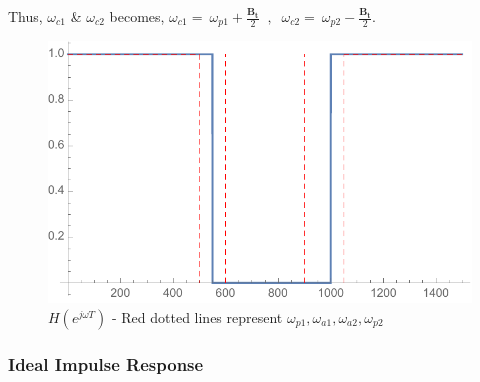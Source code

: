 \documentclass[11pt]{article}
\begin{document}
Thus, $\omega_{c1}$ \& $\omega_{c2}$ becomes,
$ \omega_{c1} =\ \omega_{p1}+\frac{\mathbf{B_{t}}}{2}$ $\ {\displaystyle ,} \ $
$ \omega_{c2} =\ \omega_{p2}-\frac{\mathbf{B_{t}}}{2}$.

\begin{figure}[H]
    \centering
    \includegraphics[scale=0.8]{HW} 
    \caption{$H(e^{j\omega T})$  - Red dotted lines represent $\omega_{p1}, \omega_{a1},\omega_{a2},\omega_{p2}$}
    \label{fig:Bandstop}
\end{figure}

\subsubsection{Ideal Impulse Response}
\end{document}

